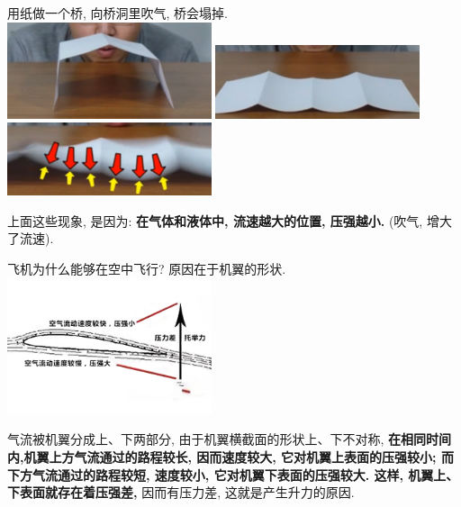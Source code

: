 \documentclass[UTF8]{ctexart}
\begin{document}
	
	\begin{tcolorbox}[title = {例},boxrule={0.1em},colframe={black!10}, colback={black!3},colbacktitle={black!10},coltitle={black}]
	用纸做一个桥, 向桥洞里吹气, 桥会塌掉. \\

\includegraphics[width=0.45\textwidth]{img/0038.png} 	
\includegraphics[width=0.45\textwidth]{img/0039.png} 
\includegraphics[width=0.45\textwidth]{img/0040.png} 
	\end{tcolorbox}


	
	上面这些现象, 是因为: \textbf{在气体和液体中, 流速越大的位置, 压强越小.} (吹气, 增大了流速).
	
	
	\begin{tcolorbox}[title = {例},boxrule={0.1em},colframe={black!10}, colback={black!3},colbacktitle={black!10},coltitle={black}]
		飞机为什么能够在空中飞行? 原因在于机翼的形状. \\
		
	\includegraphics[width=0.45\textwidth]{img/0041.png}
	
	气流被机翼分成上、下两部分, 由于机翼横截面的形状上、下不对称, \textbf{在相同时间内,机翼上方气流通过的路程较长, 因而速度较大, 它对机翼上表面的压强较小; 而下方气流通过的路程较短, 速度较小, 它对机翼下表面的压强较大. 这样, 机翼上、下表面就存在着压强差, }因而有压力差, 这就是产生升力的原因.			
	\end{tcolorbox}
\end{document}
